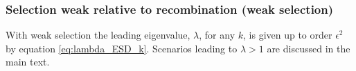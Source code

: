 \documentclass[12pt]{article}
\begin{document}
%
%

\subsubsection*{Selection weak relative to recombination (weak selection)}

With weak selection the leading eigenvalue, $\lambda$, for any $k$, is given up to order $\epsilon^2$ by equation \ref{eq:lambda_ESD_k}.
Scenarios leading to $\lambda>1$ are discussed in the main text.

\newpage

\end{document}

